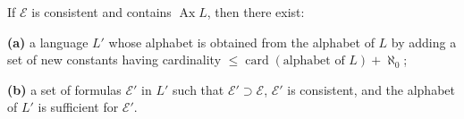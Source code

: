If $\mathcal{E}$ is consistent and contains $\operatorname{Ax} L$, then there exist:

\textbf{(a)} a language $L'$ whose alphabet is obtained from the alphabet of $L$ by adding a set of new constants having cardinality $\leqslant \operatorname{card}(\text{alphabet of } L) + \aleph_0$;

\textbf{(b)} a set of formulas $\mathcal{E}'$ in $L'$ such that $\mathcal{E}' \supset \mathcal{E}$, $\mathcal{E}'$ is consistent, and the alphabet of $L'$ is sufficient for $\mathcal{E}'$.
